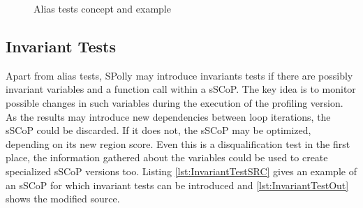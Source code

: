 \lstset{frame=none}
\begin{figure}[htbp]
  \centering

  \vspace*{5mm}
  
  \caption{Alias tests concept and example}
  \label{fig:Aliastest}  
\end{figure}
\resetlst





\subsection{Invariant Tests}
Apart from alias tests, SPolly may introduce invariants tests if there are
possibly invariant variables and a function call within a sSCoP. The key idea
is to monitor possible changes in such variables during the execution of the 
profiling version. As the results may introduce new dependencies 
between loop iterations, the sSCoP could be discarded. If it does not, the sSCoP
may be optimized, depending on its new region score. Even this is a 
disqualification test in the first place, the information gathered about the 
variables could be used to create specialized sSCoP versions too.
Listing \ref{lst:InvariantTestSRC} gives an example of an sSCoP 
for which invariant tests can be introduced and \ref{lst:InvariantTestOut} shows
the modified source. 


